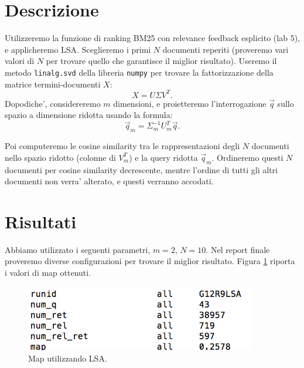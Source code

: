 \documentclass[12pt]{article}
\begin{document}
\maketitle

\section{Descrizione}
Utilizzeremo la funzione di ranking BM25 con relevance feedback esplicito (lab 5), e applicheremo LSA. Sceglieremo i primi $N$ documenti reperiti (proveremo vari valori di $N$ per trovare quello che garantisce il miglior risultato). Useremo il metodo \texttt{linalg.svd} della libreria \texttt{numpy} per trovare la fattorizzazione della matrice termini-documenti $X$:
\[ X = U \Sigma V^{T}. \]
Dopodiche', considereremo $m$ dimensioni, e proietteremo l'interrogazione $\vec{q}$ sullo spazio a dimensione ridotta usando la formula:
\[ \vec{q}_m = \Sigma^{-1}_m U^{T}_m \vec{q}. \]

Poi computeremo le cosine similarity tra le rappresentazioni degli $N$ documenti nello spazio ridotto (colonne di  $V_m^{T}$) e la query ridotta $\vec{q}_m$. Ordineremo questi $N$ documenti per cosine similarity decrescente, mentre l'ordine di tutti gli altri documenti non verra' alterato, e questi verranno accodati. 

\section{Risultati}

Abbiamo utilizzato i seguenti parametri, $m = 2$, $N=10$. Nel report finale proveremo diverse configurazioni per trovare il miglior risultato. Figura \ref{fig:uno} riporta i valori di map ottenuti.

\begin{figure}[htbp]
\begin{center}
\includegraphics[width=0.9\textwidth]{one.png}
\caption{Map utilizzando LSA.}
\label{fig:uno}
\end{center}
\end{figure}







\end{document}
